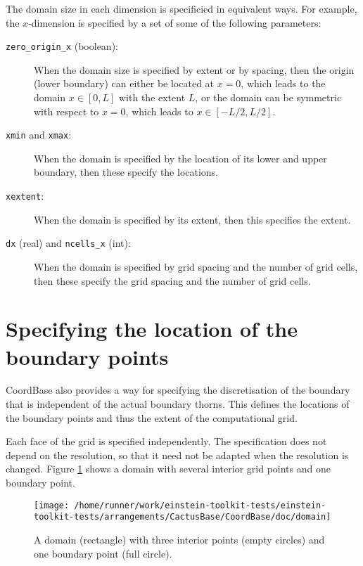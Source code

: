 The domain size in each dimension is specificied in equivalent ways.
For example, the $x$-dimension is specified by a set of some of the
following parameters:
\begin{description}
\item[{\texttt{zero\_origin\_x}} (boolean):]
When the domain size is specified by extent or by spacing, then the
origin (lower boundary) can either be located at $x=0$, which leads to
the domain $x \in [0,L]$ with the extent $L$, or the domain can be
symmetric with respect to $x=0$, which leads to $x \in [-L/2,L/2]$.
\item[{\texttt{xmin}} and {\texttt{xmax}}:]
When the domain is specified by the location of its lower and upper
boundary, then these specify the locations.
\item[{\texttt{xextent}}:]
When the domain is specified by its extent, then this specifies the
extent.
\item[{\texttt{dx}} (real) and {\texttt{ncells\_x}} (int):]
When the domain is specified by grid spacing and the number of grid
cells, then these specify the grid spacing and the number of grid
cells.
\end{description}


\section{Specifying the location of the boundary points}
\label{CactusBase:CoordBase:boundary}

CoordBase also provides a way for specifying the discretisation of the
boundary that is independent of the actual boundary thorns.  This
defines the locations of the boundary points and thus the extent of
the computational grid.

Each face of the grid is specified independently.  The specification
does not depend on the resolution, so that it need not be adapted when
the resolution is changed.  Figure
{\ref{CactusBase:CoordBase:fig-domain}} shows a domain with several
interior grid points and one boundary point.

\begin{figure}
\begin{center}
\texttt{[image: /home/runner/work/einstein-toolkit-tests/einstein-toolkit-tests/arrangements/CactusBase/CoordBase/doc/domain]}
\end{center}
\caption{A domain (rectangle) with three interior points (empty
circles) and one boundary point (full circle).}
\label{CactusBase:CoordBase:fig-domain}
\end{figure}

